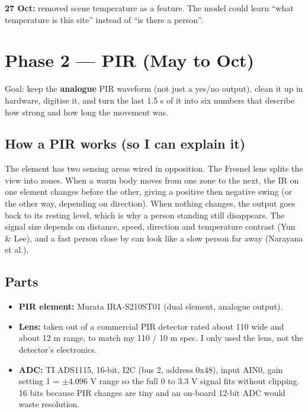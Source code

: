 \documentclass[11pt,a4paper]{article}
\providecommand{\tightlist}{\setlength{\itemsep}{0pt}\setlength{\parskip}{0pt}}
\begin{document}
\textbf{27 Oct:} removed scene
temperature as a feature. The
model could learn ``what
temperature is this site''
instead of ``is there a
person''.

\hypertarget{phase-2-pir-may-to-oct}{%
\section{Phase 2 --- PIR (May
to
Oct)}\label{phase-2-pir-may-to-oct}}

Goal: keep the
\textbf{analogue} PIR waveform
(not just a yes/no output),
clean it up in hardware,
digitise it, and turn the last
1.5 s of it into six numbers
that describe how strong and
how long the movement was.

\hypertarget{how-a-pir-works-so-i-can-explain-it}{%
\subsection{How a PIR works
(so I can explain
it)}\label{how-a-pir-works-so-i-can-explain-it}}

The element has two sensing
areas wired in opposition. The
Fresnel lens splits the view
into zones. When a warm body
moves from one zone to the
next, the IR on one element
changes before the other,
giving a positive then
negative swing (or the other
way, depending on direction).
When nothing changes, the
output goes back to its
resting level, which is why a
person standing still
disappears. The signal size
depends on distance, speed,
direction and temperature
contrast (Yun \& Lee), and a
fast person close by can look
like a slow person far away
(Narayana et al.).

\hypertarget{parts}{%
\subsection{Parts}\label{parts}}

\begin{itemize}
\tightlist
\item
  \textbf{PIR element:} Murata
  IRA-S210ST01 (dual element,
  analogue output).
\item
  \textbf{Lens:} taken out of
  a commercial PIR detector
  rated about 110\textdegree{} wide and
  about 12 m range, to match
  my 110\textdegree{} / 10 m spec. I only
  used the lens, not the
  detector's electronics.
\item
  \textbf{ADC:} TI ADS1115,
  16-bit, I2C (bus 2, address
  0x48), input AIN0, gain
  setting 1 = $\pm$4.096 V range
  so the full 0 to 3.3 V
  signal fits without
  clipping. 16 bits because
  PIR changes are tiny and an
  on-board 12-bit ADC would
  waste resolution.
\end{itemize}
\end{document}
